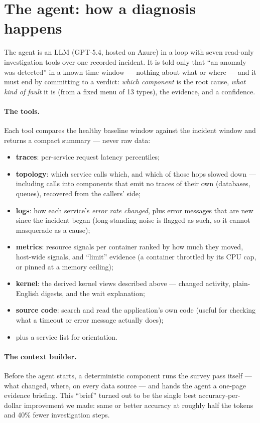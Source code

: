\section{The agent: how a diagnosis happens}
\label{sec:agent}

The agent is an LLM (GPT-5.4, hosted on Azure) in a loop with seven read-only
investigation tools over one recorded incident. It is told only that ``an anomaly was
detected'' in a known time window --- nothing about what or where --- and it must end
by committing to a verdict: \emph{which component} is the root cause, \emph{what kind
of fault} it is (from a fixed menu of 13 types), the evidence, and a confidence.

\paragraph{The tools.} Each tool compares the healthy baseline window against the
incident window and returns a compact summary --- never raw data:
\begin{itemize}
  \item \textbf{traces}: per-service request latency percentiles;
  \item \textbf{topology}: which service calls which, and which of those hops slowed
  down --- including calls into components that emit no traces of their own
  (databases, queues), recovered from the callers' side;
  \item \textbf{logs}: how each service's \emph{error rate changed}, plus error
  messages that are new since the incident began (long-standing noise is flagged as
  such, so it cannot masquerade as a cause);
  \item \textbf{metrics}: resource signals per container ranked by how much they
  moved, host-wide signals, and ``limit'' evidence (a container throttled by its CPU
  cap, or pinned at a memory ceiling);
  \item \textbf{kernel}: the derived kernel views described above --- changed activity,
  plain-English digests, and the wait explanation;
  \item \textbf{source code}: search and read the application's own code (useful for
  checking what a timeout or error message actually does);
  \item plus a service list for orientation.
\end{itemize}

\paragraph{The context builder.} Before the agent starts, a deterministic component
runs the survey pass itself --- what changed, where, on every data source --- and
hands the agent a one-page evidence briefing. This ``brief'' turned out to be the
single best accuracy-per-dollar improvement we made: same or better accuracy at
roughly half the tokens and 40\% fewer investigation steps.

